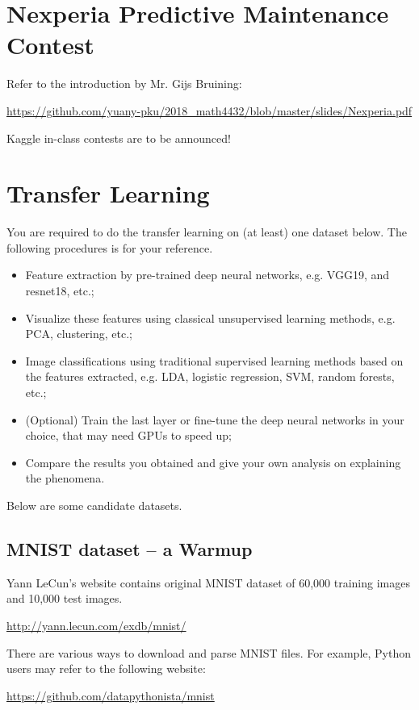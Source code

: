 \documentclass[11pt]{article}
\begin{document}
\section{Nexperia Predictive Maintenance Contest}

Refer to the introduction by Mr. Gijs Bruining:

\url{https://github.com/yuany-pku/2018_math4432/blob/master/slides/Nexperia.pdf}

Kaggle in-class contests are to be announced!

\section{Transfer Learning}

You are required to do the transfer learning on (at least) one dataset below. The following procedures is for your reference.

\begin{itemize}
\item Feature extraction by pre-trained deep neural networks, e.g. VGG19, and resnet18, etc.;
\item Visualize these features using classical unsupervised learning methods, e.g. PCA, clustering, etc.; 
\item Image classifications using traditional supervised learning methods based on the features extracted, e.g. LDA, logistic regression, SVM, random forests, etc.;
\item (Optional) Train the last layer or fine-tune the deep neural networks in your choice, that may need GPUs to speed up; 
\item Compare the results you obtained and give your own analysis on explaining the phenomena.
\end{itemize}

Below are some candidate datasets. 

\subsection{MNIST dataset -- a Warmup}

Yann LeCun's website contains original MNIST dataset of 60,000 training images and 10,000 test images. 

\url{http://yann.lecun.com/exdb/mnist/}

There are various ways to download and parse MNIST files. For example, Python users may refer to the following website:

\url{https://github.com/datapythonista/mnist}
\end{document}
